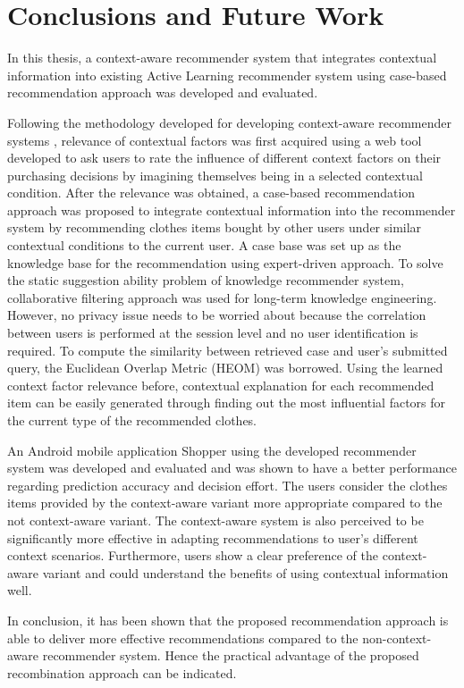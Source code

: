 \chapter{Conclusions and Future Work}\label{chapter:conclusions}

In this thesis, a context-aware recommender system that integrates contextual information into existing Active Learning recommender system using case-based recommendation approach was developed and evaluated.

Following the methodology developed for developing context-aware recommender systems \cite{ref:5}, relevance of contextual factors was first acquired using a web tool developed to ask users to rate the influence of different context factors on their purchasing decisions by imagining themselves being in a selected contextual condition. After the relevance was obtained, a case-based recommendation approach was proposed to integrate contextual information into the recommender system by recommending clothes items bought by other users under similar contextual conditions to the current user. A case base was set up as the knowledge base for the recommendation using expert-driven approach. To solve the static suggestion ability problem of knowledge recommender system, collaborative filtering approach was used for long-term knowledge engineering. However, no privacy issue needs to be worried about because the correlation between users is performed at the session level and no user identification is required. To compute the similarity between retrieved case and user's submitted query, the Euclidean Overlap Metric (HEOM) was borrowed. Using the learned context factor relevance before, contextual explanation for each recommended item can be easily generated through finding out the most influential factors for the current type of the recommended clothes.

An Android mobile application Shopper using the developed recommender system was developed and evaluated and was shown to have a better performance regarding prediction accuracy and decision effort. The users consider the clothes items provided by the context-aware variant more appropriate compared to the not context-aware variant. The context-aware system is also perceived to be significantly more effective in adapting recommendations to user's different context scenarios. Furthermore, users show a clear preference of the context-aware variant and could understand the benefits of using contextual information well. 

In conclusion, it has been shown that the proposed recommendation approach is able to deliver more effective recommendations compared to the non-context-aware recommender system. Hence the practical advantage of the proposed recombination approach can be indicated.

